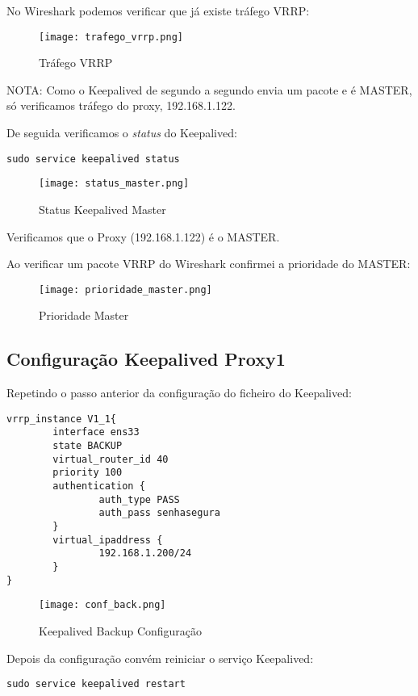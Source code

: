 \newpage
No Wireshark podemos verificar que já existe tráfego VRRP:
\begin{figure}[H]
\center
\texttt{[image: trafego\_vrrp.png]}
\caption{Tráfego VRRP}
\end{figure}

NOTA: Como o Keepalived de segundo a segundo envia um pacote e é MASTER, só verificamos tráfego do proxy, 192.168.1.122.

\hfill \break
\indent De seguida verificamos o \textit{status} do Keepalived:
\begin{verbatim}sudo service keepalived status\end{verbatim}

\begin{figure}[H]
\center
\texttt{[image: status\_master.png]}
\caption{Status Keepalived Master}
\end{figure}

Verificamos que o Proxy (192.168.1.122) é o MASTER.

\newpage
Ao verificar um pacote VRRP do Wireshark confirmei a prioridade do MASTER:

\begin{figure}[H]
\center
\texttt{[image: prioridade\_master.png]}
\caption{Prioridade Master}
\end{figure}


\newpage
\subsection{Configuração Keepalived Proxy1}
Repetindo o passo anterior da configuração do ficheiro do Keepalived:

\begin{verbatim}vrrp_instance V1_1{
        interface ens33
        state BACKUP
        virtual_router_id 40
        priority 100
        authentication {
                auth_type PASS
                auth_pass senhasegura
        }       
        virtual_ipaddress {
                192.168.1.200/24
        }
}\end{verbatim}

\begin{figure}[H]
\center
\texttt{[image: conf\_back.png]}
\caption{Keepalived Backup Configuração}
\end{figure}

Depois da configuração convém reiniciar o serviço Keepalived:
\begin{verbatim}sudo service keepalived restart\end{verbatim}

